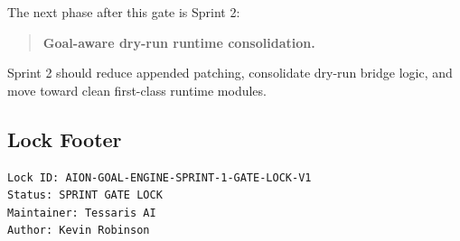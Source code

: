 The next phase after this gate is Sprint 2:

\begin{quote}
\textbf{Goal-aware dry-run runtime consolidation.}
\end{quote}

Sprint 2 should reduce appended patching, consolidate dry-run bridge logic, and move toward clean first-class runtime modules.

\subsection{Lock Footer}

\begin{verbatim}
Lock ID: AION-GOAL-ENGINE-SPRINT-1-GATE-LOCK-V1
Status: SPRINT GATE LOCK
Maintainer: Tessaris AI
Author: Kevin Robinson
\end{verbatim}
